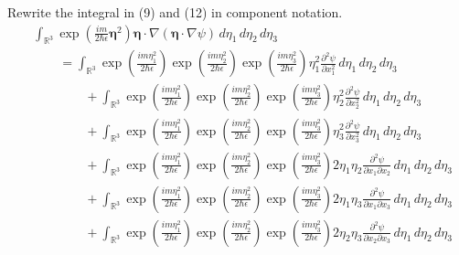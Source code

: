 \documentclass[12pt]{article}
\begin{document}
Rewrite the integral in (9) and (12) in component notation.
\begin{align*}
&\int_{\mathbb R^3}
\exp\left(\frac{im}{2\hbar\epsilon}\boldsymbol\eta^2\right)
\boldsymbol\eta\cdot\nabla(\boldsymbol\eta\cdot\nabla\psi)
\,d\eta_1\,d\eta_2\,d\eta_3
\\
&\qquad{}=\int_{\mathbb R^3}
\exp\left(\frac{im\eta_1^2}{2\hbar\epsilon}\right)
\exp\left(\frac{im\eta_2^2}{2\hbar\epsilon}\right)
\exp\left(\frac{im\eta_3^2}{2\hbar\epsilon}\right)
\eta_1^2\frac{\partial^2\psi}{\partial x_1^2}
\,d\eta_1\,d\eta_2\,d\eta_3
\\
&\qquad\qquad{}+\int_{\mathbb R^3}
\exp\left(\frac{im\eta_1^2}{2\hbar\epsilon}\right)
\exp\left(\frac{im\eta_2^2}{2\hbar\epsilon}\right)
\exp\left(\frac{im\eta_3^2}{2\hbar\epsilon}\right)
\eta_2^2\frac{\partial^2\psi}{\partial x_2^2}
\,d\eta_1\,d\eta_2\,d\eta_3
\\
&\qquad\qquad{}+\int_{\mathbb R^3}
\exp\left(\frac{im\eta_1^2}{2\hbar\epsilon}\right)
\exp\left(\frac{im\eta_2^2}{2\hbar\epsilon}\right)
\exp\left(\frac{im\eta_3^2}{2\hbar\epsilon}\right)
\eta_3^2\frac{\partial^2\psi}{\partial x_3^2}
\,d\eta_1\,d\eta_2\,d\eta_3
\\
&\qquad\qquad{}+\int_{\mathbb R^3}
\exp\left(\frac{im\eta_1^2}{2\hbar\epsilon}\right)
\exp\left(\frac{im\eta_2^2}{2\hbar\epsilon}\right)
\exp\left(\frac{im\eta_3^2}{2\hbar\epsilon}\right)
2\eta_1\eta_2\frac{\partial^2\psi}{\partial x_1\partial x_2}
\,d\eta_1\,d\eta_2\,d\eta_3
\\
&\qquad\qquad{}+\int_{\mathbb R^3}
\exp\left(\frac{im\eta_1^2}{2\hbar\epsilon}\right)
\exp\left(\frac{im\eta_2^2}{2\hbar\epsilon}\right)
\exp\left(\frac{im\eta_3^2}{2\hbar\epsilon}\right)
2\eta_1\eta_3\frac{\partial^2\psi}{\partial x_1\partial x_3}
\,d\eta_1\,d\eta_2\,d\eta_3
\\
&\qquad\qquad{}+\int_{\mathbb R^3}
\exp\left(\frac{im\eta_1^2}{2\hbar\epsilon}\right)
\exp\left(\frac{im\eta_2^2}{2\hbar\epsilon}\right)
\exp\left(\frac{im\eta_3^2}{2\hbar\epsilon}\right)
2\eta_2\eta_3\frac{\partial^2\psi}{\partial x_2\partial x_3}
\,d\eta_1\,d\eta_2\,d\eta_3
\end{align*}
\end{document}
